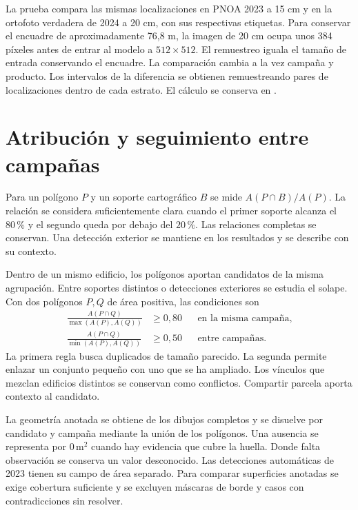 \documentclass[11pt,a4paper]{article}
\begin{document}
La prueba compara las mismas localizaciones en PNOA 2023 a 15 cm y en la ortofoto verdadera de 2024 a 20 cm, con sus respectivas etiquetas. Para conservar el encuadre de aproximadamente 76,8 m, la imagen de 20 cm ocupa unos 384 píxeles antes de entrar al modelo a \(512\times512\). El remuestreo iguala el tamaño de entrada conservando el encuadre. La comparación cambia a la vez campaña y producto. Los intervalos de la diferencia se obtienen remuestreando pares de localizaciones dentro de cada estrato. El cálculo se conserva en .

\section{Atribución y seguimiento entre campañas}

Para un polígono \(P\) y un soporte cartográfico \(B\) se mide \(A(P\cap B)/A(P)\). La relación se considera suficientemente clara cuando el primer soporte alcanza el \(80\,\%\) y el segundo queda por debajo del \(20\,\%\). Las relaciones completas se conservan. Una detección exterior se mantiene en los resultados y se describe con su contexto.

Dentro de un mismo edificio, los polígonos aportan candidatos de la misma agrupación. Entre soportes distintos o detecciones exteriores se estudia el solape. Con dos polígonos \(P,Q\) de área positiva, las condiciones son
\[
\begin{aligned}
\frac{A(P\cap Q)}{\max(A(P),A(Q))}&\geq 0{,}80 && \text{en la misma campaña},\\
\frac{A(P\cap Q)}{\min(A(P),A(Q))}&\geq 0{,}50 && \text{entre campañas}.
\end{aligned}
\]
La primera regla busca duplicados de tamaño parecido. La segunda permite enlazar un conjunto pequeño con uno que se ha ampliado. Los vínculos que mezclan edificios distintos se conservan como conflictos. Compartir parcela aporta contexto al candidato.

La geometría anotada se obtiene de los dibujos completos y se disuelve por candidato y campaña mediante la unión de los polígonos. Una ausencia se representa por \(0\,\mathrm{m}^2\) cuando hay evidencia que cubre la huella. Donde falta observación se conserva un valor desconocido. Las detecciones automáticas de 2023 tienen su campo de área separado. Para comparar superficies anotadas se exige cobertura suficiente y se excluyen máscaras de borde y casos con contradicciones sin resolver.
\end{document}
